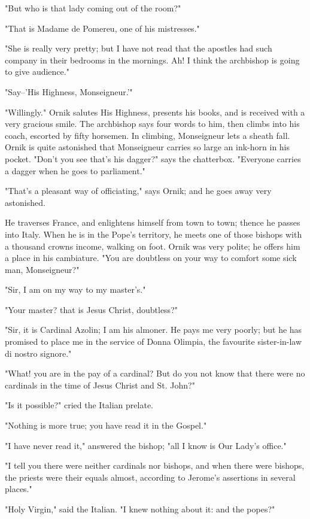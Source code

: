 "But who is that lady coming out of the room?"

"That is Madame de Pomereu, one of his mistresses."

"She is really very pretty; but I have not read that the apostles had
such company in their bedrooms in the mornings. Ah! I think the
archbishop is going to give audience."

"Say--'His Highness, Monseigneur.'"

"Willingly." Ornik salutes His Highness, presents his books, and is
received with a very gracious smile. The archbishop says four words to
him, then climbs into his coach, escorted by fifty horsemen. In
climbing, Monseigneur lets a sheath fall. Ornik is quite astonished that
Monseigneur carries so large an ink-horn in his pocket. "Don't you see
that's his dagger?" says the chatterbox. "Everyone carries a dagger when
he goes to parliament."

"That's a pleasant way of officiating," says Ornik; and he goes away
very astonished.

He traverses France, and enlightens himself from town to town; thence he
passes into Italy. When he is in the Pope's territory, he meets one of
those bishops with a thousand crowns income, walking on foot. Ornik was
very polite; he offers him a place in his cambiature. "You are doubtless
on your way to comfort some sick man, Monseigneur?"

"Sir, I am on my way to my master's."

"Your master? that is Jesus Christ, doubtless?"

"Sir, it is Cardinal Azolin; I am his almoner. He pays me very poorly;
but he has promised to place me in the service of Donna Olimpia, the
favourite sister-in-law di nostro signore."

"What! you are in the pay of a cardinal? But do you not know that there
were no cardinals in the time of Jesus Christ and St. John?"

"Is it possible?" cried the Italian prelate.

"Nothing is more true; you have read it in the Gospel."

"I have never read it," answered the bishop; "all I know is Our Lady's
office."

"I tell you there were neither cardinals nor bishops, and when there
were bishops, the priests were their equals almost, according to
Jerome's assertions in several places."

"Holy Virgin," said the Italian. "I knew nothing about it: and the
popes?"

